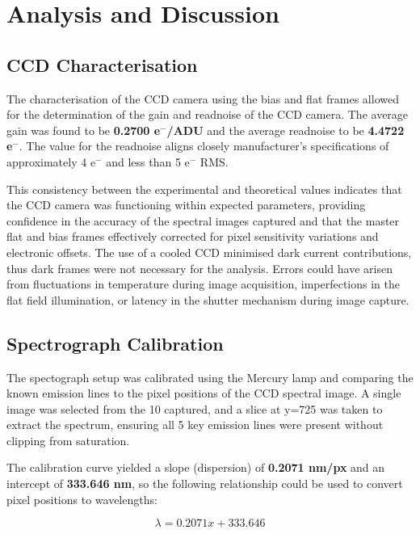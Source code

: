 \documentclass[11pt, a4paper, twocolumn]{article}
\begin{document}
\section{Analysis and Discussion} \label{sec:4}

\subsection{CCD Characterisation}

The characterisation of the CCD camera using the bias and flat frames allowed for the determination of the gain and readnoise of
the CCD camera. The average gain was found to be \textbf{0.2700 e$^-$/ADU} and the average readnoise to be \textbf{4.4722 e$^-$}.
The value for the readnoise aligns closely manufacturer's specifications of approximately 4 e$^-$ and less than 5 e$^-$ RMS. \cite{atikseries3manual}

This consistency between the experimental and theoretical values indicates that the CCD camera was functioning within expected
parameters, providing confidence in the accuracy of the spectral images captured and that the master flat and bias frames effectively
corrected for pixel sensitivity variations and electronic offsets. The use of a cooled CCD minimised dark current contributions, thus 
dark frames were not necessary for the analysis. Errors could have arisen from fluctuations in temperature during image acquisition,
imperfections in the flat field illumination, or latency in the shutter mechanism during image capture.

\subsection{Spectrograph Calibration}

The spectograph setup was calibrated using the Mercury lamp and comparing the known emission lines to the pixel positions of the
CCD spectral image. A single image was selected from the 10 captured, and a slice at y=725 was taken to extract the spectrum, ensuring
all 5 key emission lines were present without clipping from saturation.

The calibration curve yielded a slope (dispersion) of \textbf{0.2071 nm/px} and an intercept of \textbf{333.646 nm}, so the
following relationship could be used to convert pixel positions to wavelengths:

\begin{equation*}
  \lambda = 0.2071 x + 333.646
\end{equation*}
\end{document}
